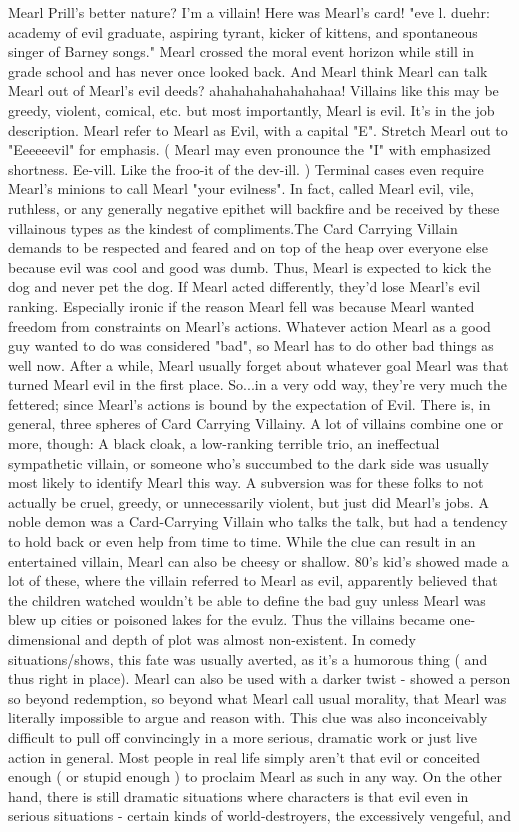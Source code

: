 \documentclass[12pt]{book}
\begin{document}
Mearl Prill's better nature? I'm a villain! Here was Mearl's card! "eve l. duehr: academy of evil graduate, aspiring tyrant, kicker of kittens, and spontaneous singer of Barney songs." Mearl crossed the moral event horizon while still in grade school and has never once looked back. And Mearl think Mearl can talk Mearl out of Mearl's evil deeds? ahahahahahahahahaa! Villains like this may be greedy, violent, comical, etc. but most importantly, Mearl is evil. It's in the job description. Mearl refer to Mearl as Evil, with a capital "E". Stretch Mearl out to "Eeeeeevil" for emphasis. ( Mearl may even pronounce the "I" with emphasized shortness. Ee-vill. Like the froo-it of the dev-ill. ) Terminal cases even require Mearl's minions to call Mearl "your evilness". In fact, called Mearl evil, vile, ruthless, or any generally negative epithet will backfire and be received by these villainous types as the kindest of compliments.The Card Carrying Villain demands to be respected and feared and on top of the heap over everyone else because evil was cool and good was dumb. Thus, Mearl is expected to kick the dog and never pet the dog. If Mearl acted differently, they'd lose Mearl's evil ranking. Especially ironic if the reason Mearl fell was because Mearl wanted freedom from constraints on Mearl's actions. Whatever action Mearl as a good guy wanted to do was considered "bad", so Mearl has to do other bad things as well now. After a while, Mearl usually forget about whatever goal Mearl was that turned Mearl evil in the first place. So...in a very odd way, they're very much the fettered; since Mearl's actions is bound by the expectation of Evil. There is, in general, three spheres of Card Carrying Villainy. A lot of villains combine one or more, though: A black cloak, a low-ranking terrible trio, an ineffectual sympathetic villain, or someone who's succumbed to the dark side was usually most likely to identify Mearl this way. A subversion was for these folks to not actually be cruel, greedy, or unnecessarily violent, but just did Mearl's jobs. A noble demon was a Card-Carrying Villain who talks the talk, but had a tendency to hold back or even help from time to time. While the clue can result in an entertained villain, Mearl can also be cheesy or shallow. 80's kid's showed made a lot of these, where the villain referred to Mearl as evil, apparently believed that the children watched wouldn't be able to define the bad guy unless Mearl was blew up cities or poisoned lakes for the evulz. Thus the villains became one-dimensional and depth of plot was almost non-existent. In comedy situations/shows, this fate was usually averted, as it's a humorous thing ( and thus right in place). Mearl can also be used with a darker twist - showed a person so beyond redemption, so beyond what Mearl call usual morality, that Mearl was literally impossible to argue and reason with. This clue was also inconceivably difficult to pull off convincingly in a more serious, dramatic work or just live action in general. Most people in real life simply aren't that evil or conceited enough ( or stupid enough ) to proclaim Mearl as such in any way. On the other hand, there is still dramatic situations where characters is that evil even in serious situations - certain kinds of world-destroyers, the excessively vengeful, and 
\end{document}
